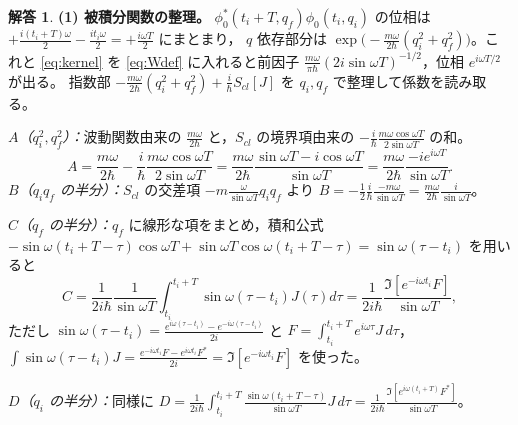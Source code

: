 \documentclass[dvipdfmx, uplatex]{jsarticle}
\theoremstyle{definition}
\newtheorem*{sol}{解答}
\begin{document}
\begin{sol}
\textbf{(1) 被積分関数の整理。}
$\phi_0^*(t_i+T,q_f)\phi_0(t_i,q_i)$ の位相は
$+\frac{i(t_i+T)\omega}{2}-\frac{it_i\omega}{2}=+\frac{i\omega T}{2}$ にまとまり，
$q$ 依存部分は $\exp\!\big(-\frac{m\omega}{2\hbar}(q_i^2+q_f^2)\big)$。これと \eqref{eq:kernel} を
\eqref{eq:Wdef} に入れると前因子 $\frac{m\omega}{\pi\hbar}(2i\sin\omega T)^{-1/2}$，位相 $e^{i\omega T/2}$ が出る。
指数部 $-\frac{m\omega}{2\hbar}(q_i^2+q_f^2)+\frac{i}{\hbar}S_{cl}[J]$ を $q_i,q_f$ で整理して係数を読み取る。

\par\smallskip
\textit{$A$（$q_i^2,q_f^2$）：}波動関数由来の $\frac{m\omega}{2\hbar}$ と，$S_{cl}$ の境界項由来の
$-\frac{i}{\hbar}\frac{m\omega\cos\omega T}{2\sin\omega T}$ の和。
\[
    A=\frac{m\omega}{2\hbar}-\frac{i}{\hbar}\frac{m\omega\cos\omega T}{2\sin\omega T}
    =\frac{m\omega}{2\hbar}\frac{\sin\omega T-i\cos\omega T}{\sin\omega T}
    =\frac{m\omega}{2\hbar}\frac{-ie^{i\omega T}}{\sin\omega T}.
\]
\textit{$B$（$q_iq_f$ の半分）：}$S_{cl}$ の交差項 $-m\frac{\omega}{\sin\omega T}q_iq_f$ より
$B=-\frac12\frac{i}{\hbar}\frac{-m\omega}{\sin\omega T}=\frac{m\omega}{2\hbar}\frac{i}{\sin\omega T}$。

\par\smallskip
\textit{$C$（$q_f$ の半分）：}$q_f$ に線形な項をまとめ，積和公式
$-\sin\omega(t_i+T-\tau)\cos\omega T+\sin\omega T\cos\omega(t_i+T-\tau)=\sin\omega(\tau-t_i)$ を用いると
\[
    C=\frac{1}{2i\hbar}\frac{1}{\sin\omega T}\int_{t_i}^{t_i+T}\!\sin\omega(\tau-t_i)J(\tau)d\tau
    =\frac{1}{2i\hbar}\frac{\Im[e^{-i\omega t_i}F]}{\sin\omega T},
\]
ただし $\sin\omega(\tau-t_i)=\frac{e^{i\omega(\tau-t_i)}-e^{-i\omega(\tau-t_i)}}{2i}$ と
$F=\int_{t_i}^{t_i+T}e^{i\omega\tau}J\,d\tau$，
$\int\sin\omega(\tau-t_i)J=\frac{e^{-i\omega t_i}F-e^{i\omega t_i}F^*}{2i}=\Im[e^{-i\omega t_i}F]$ を使った。

\par\smallskip
\textit{$D$（$q_i$ の半分）：}同様に
$D=\frac{1}{2i\hbar}\int_{t_i}^{t_i+T}\frac{\sin\omega(t_i+T-\tau)}{\sin\omega T}J\,d\tau
=\frac{1}{2i\hbar}\frac{\Im[e^{i\omega(t_i+T)}F^*]}{\sin\omega T}$。


\end{sol}
\end{document}
